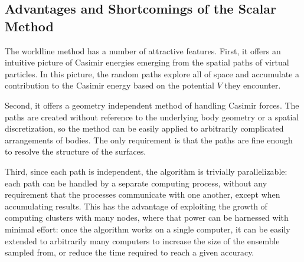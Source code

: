 
\subsection{Advantages and Shortcomings of the Scalar Method}

The worldline method has a number of attractive features.  
First, it offers an intuitive picture of Casimir energies emerging from the spatial paths 
of virtual particles.   In this picture, the random paths explore all of space
and accumulate a contribution to the Casimir energy based on the potential $V$ they encounter.

Second, it offers a geometry independent method of handling Casimir forces.  The paths are 
created without reference to the underlying body geometry or a spatial discretization, so the method can be easily applied to arbitrarily
complicated arrangements of bodies.  The only requirement is that the paths are fine enough
to resolve the structure of the surfaces.  

Third, since each path is independent, the algorithm is trivially parallelizable: each path
can be handled by a separate computing process, without any requirement that the processes communicate
with one another, except when accumulating results.  This has the advantage of exploiting the growth of computing clusters with many nodes,
where that power can be harnessed with minimal effort: once the algorithm works on a single computer,
it can be easily extended to arbitrarily many computers to increase the size of the ensemble sampled
from, or reduce the time required to reach a given accuracy.  



